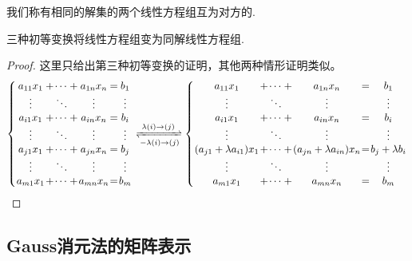 \begin{frame}
我们称有相同的解集的两个线性方程组互为对方的. \pp
\begin{theorem}
三种初等变换将线性方程组变为同解线性方程组.
\end{theorem} \pp
\begin{proof} \tiny
这里只给出第三种初等变换的证明，其他两种情形证明类似。\pp
\begin{equation*}
\setlength{\arraycolsep}{0.5pt}
\left\{\begin{array}{ccccccccc}
a_{11}x_1& + & \cdots & + & a_{1n}x_n &= & b_1\\
\vdots & & 	\ddots && 	\vdots && 	\vdots \\
a_{i1}x_1& + & \cdots & + & a_{in}x_n &= & b_i\\
\vdots && 	\ddots && 	\vdots && 	\vdots \\
a_{j1}x_1& + & \cdots & + & a_{jn}x_n &= & b_j\\
\vdots && 	\ddots && 	\vdots && 	\vdots \\
a_{m1}x_1& + & \cdots & + & a_{mn}x_n &= & b_m\\
\end{array}\right.
\xrightleftharpoons[-\lambda(i)\rightarrow(j)]{\lambda(i)\rightarrow(j)}
\left\{\begin{array}{ccccccccc}
a_{11}x_1&+ & \cdots & + & a_{1n}x_n &= & b_1\\
\vdots && 	\ddots && 	\vdots && 	\vdots \\
a_{i1}x_1&+ & \cdots & + & a_{in}x_n &= & b_i\\
\vdots && 	\ddots && 	\vdots && 	\vdots \\
(a_{j1}+\lambda a_{i1})x_1& + & \cdots & + & (a_{jn}+\lambda a_{in})x_n &= & b_j+\lambda b_i\\
\vdots && 	\ddots && 	\vdots && 	\vdots \\
a_{m1}x_1& + & \cdots & + & a_{mn}x_n &= & b_m\\
\end{array}\right.
\end{equation*}
\end{proof}
\end{frame}









\subsection{Gauss消元法的矩阵表示}


